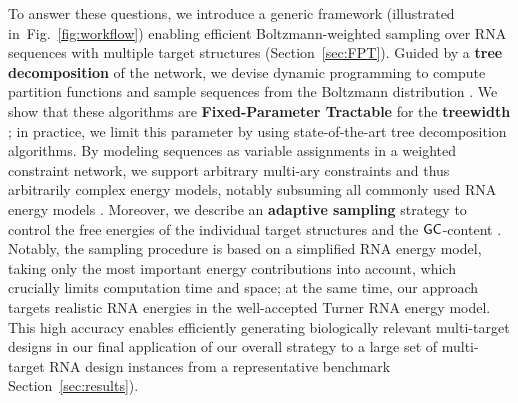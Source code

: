 \documentclass{bioinfo}
\newcommand{\Def}[1]{{\bf #1}}
\newcommand{\Nuc}[1]{{\sf #1}}
\newcommand{\Cb}{\Nuc{C}}
\newcommand{\Gb}{\Nuc{G}}
\begin{document}
To answer these questions, we introduce a generic framework (illustrated in~Fig.~\ref{fig:workflow}) enabling efficient Boltzmann-weighted sampling over RNA sequences with multiple target structures (Section~\ref{sec:FPT}). Guided by a \Def{tree decomposition} of the network, we devise dynamic programming to compute partition functions and sample sequences from the Boltzmann distribution%
. We show that these algorithms are \Def{Fixed-Parameter Tractable} for the \Def{treewidth}%
%
; in practice, we limit this parameter by using state-of-the-art tree decomposition algorithms. 
By modeling sequences as variable assignments in a weighted constraint
network, we support arbitrary multi-ary constraints and thus
arbitrarily complex energy models,
notably subsuming all commonly
used RNA energy models%
.  Moreover, we describe an \Def{adaptive
  sampling} strategy to control the free energies of the individual
target structures and the $\Gb\Cb$-content%
. Notably, the sampling procedure is based on a simplified RNA energy model, taking only the most important energy contributions into account, which crucially limits computation time and space; at the same time, our approach targets realistic RNA energies in the well-accepted Turner RNA energy model. This high accuracy enables efficiently generating biologically relevant multi-target designs in our final application of our overall strategy to a large set of multi-target RNA design instances from a representative benchmark Section~\ref{sec:results}).

\end{document}
